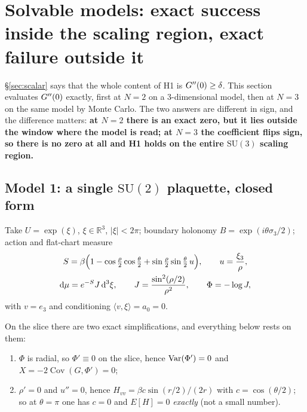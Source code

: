 \section{Solvable models: exact success inside the scaling region, exact failure outside it}
\label{sec:failure}

\S\ref{sec:scalar} says that the whole content of H1 is $G''(0)\ge\delta$. This section evaluates
$G''(0)$ exactly, first at $N=2$ on a 3-dimensional model, then at $N=3$ on the same model by Monte
Carlo. The two answers are different in sign, and the difference matters: \textbf{at $N=2$ there is
an exact zero, but it lies outside the window where the model is read; at $N=3$ the coefficient flips
sign, so there is no zero at all and H1 holds on the entire $\mathrm{SU}(3)$ scaling region.}

\subsection{Model 1: a single $\mathrm{SU}(2)$ plaquette, closed form}

Take $U=\exp(\xi)$, $\xi\in\mathbb{R}^{3}$, $|\xi|<2\pi$; boundary holonomy
$B=\exp(i\theta\sigma_3/2)$; action and flat-chart measure
\begin{gather}
  S=\beta\Big(1-\cos\tfrac{\rho}{2}\cos\tfrac{\theta}{2}
            +\sin\tfrac{\rho}{2}\sin\tfrac{\theta}{2}\,u\Big),
  \qquad u=\frac{\xi_3}{\rho},\notag\\
  \mathrm{d}\mu = e^{-S}J\,\mathrm{d}^{3}\xi,
  \qquad J=\frac{\sin^{2}(\rho/2)}{\rho^{2}},
  \qquad \Phi=-\log J ,
  \label{eq:model1}
\end{gather}
with $v=e_3$ and conditioning $\langle v,\xi\rangle = a_0 = 0$. \LT
{}

On the slice there are two exact simplifications, and everything below rests on them: \LT
\begin{enumerate}[label=(\roman*)]
\item $\Phi$ is radial, so $\Phi'\equiv 0$ on the slice, hence $\operatorname{Var}(\Phi')=0$ and
      $X=-2\operatorname{Cov}(G,\Phi')=0$;
\item $\rho'=0$ and $u''=0$, hence $H_{vv}=\beta c\sin(r/2)/(2r)$ with $c=\cos(\theta/2)$; so at
      $\theta=\pi$ one has $c=0$ and $E[H]=0$ \emph{exactly} (not a small number).
\end{enumerate}


